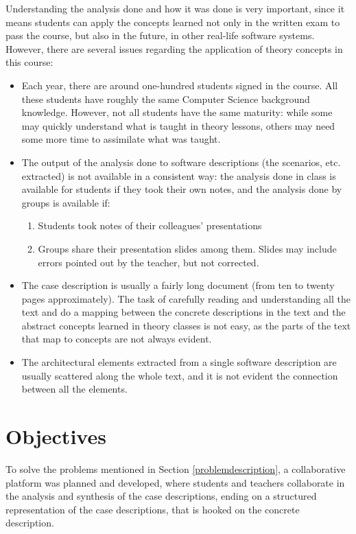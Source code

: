 \documentclass{llncs}
\begin{document}
Understanding the analysis done and how it was done is very important, since it means students can apply the concepts learned not only in the written exam to pass the course, but also in the future, in other real-life software systems.
However, there are several issues regarding the application of theory concepts in this course:
\begin{itemize}
\item Each year, there are around one-hundred students signed in the course. All these students have roughly the same Computer Science background knowledge. However, not all students have the same maturity: while some may quickly understand what is taught in theory lessons, others may need some more time to assimilate what was taught.

\item The output of the analysis done to software descriptions (the scenarios, etc. extracted) is not available in a consistent way: the analysis done in class is available for students if they took their own notes, and the analysis done by groups is available if:
\begin{enumerate}
\item Students took notes of their colleagues' presentations 

\item Groups share their presentation slides among them. Slides may include errors pointed out by the teacher, but not corrected.

\end{enumerate} 
\item The case description is usually a fairly long document (from ten to twenty pages approximately). The task of carefully reading and understanding all the text and do a mapping between the concrete descriptions in the text and the abstract concepts learned in theory classes is not easy, as the parts of the text that map to concepts are not always evident.
\item The architectural elements extracted from a single software description are usually scattered along the whole text, and it is not evident the connection between all the elements.
\end{itemize}

\section{Objectives}
\label{objectives}
To solve the problems mentioned in Section \ref{problemdescription}, a collaborative platform was planned and developed, where students and teachers collaborate in the analysis and synthesis of the case descriptions, ending on a structured representation of the case descriptions, that is hooked on the concrete description. 
\end{document}
